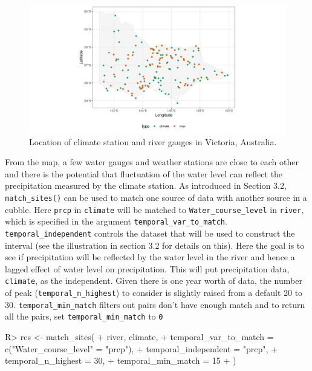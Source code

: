 \documentclass[
]{jss}
\begin{document}
\begin{CodeChunk}
\begin{figure}

{\centering \includegraphics[width=1\linewidth]{figures/matching-map} 

}

\caption[Location of climate station and river gauges in Victoria, Australia]{Location of climate station and river gauges in Victoria, Australia.}\label{fig:matching-map}
\end{figure}
\end{CodeChunk}

From the map, a few water gauges and weather stations are close to each
other and there is the potential that fluctuation of the water level can
reflect the precipitation measured by the climate station. As introduced
in Section 3.2, \texttt{match\_sites()} can be used to match one source
of data with another source in a cubble. Here \texttt{prcp} in
\texttt{climate} will be matched to \texttt{Water\_course\_level} in
\texttt{river}, which is specified in the argument
\texttt{temporal\_var\_to\_match}. \texttt{temporal\_independent}
controls the dataset that will be used to construct the interval (see
the illustration in section 3.2 for details on this). Here the goal is
to see if precipitation will be reflected by the water level in the
river and hence a lagged effect of water level on precipitation. This
will put precipitation data, \texttt{climate}, as the independent. Given
there is one year worth of data, the number of peak
(\texttt{temporal\_n\_highest}) to consider is slightly raised from a
default 20 to 30. \texttt{temporal\_min\_match} filters out pairs don't
have enough match and to return all the pairs, set
\texttt{temporal\_min\_match} to \texttt{0}

\begin{CodeChunk}
\begin{CodeInput}
R> res <- match_sites(
+   river, climate,
+   temporal_var_to_match = c("Water_course_level" = "prcp"),
+   temporal_independent = "prcp",  
+   temporal_n_highest = 30,
+   temporal_min_match = 15
+ )
\end{CodeInput}
\end{CodeChunk}
\end{document}
